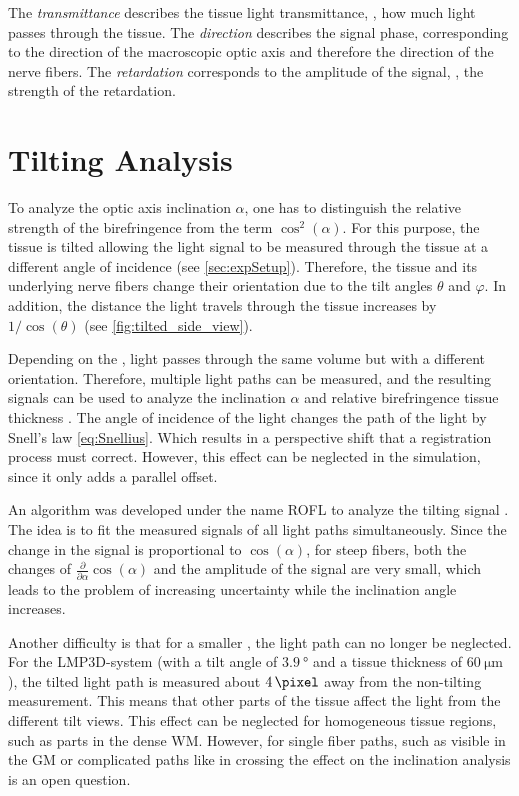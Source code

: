 %
The \textit{transmittance} describes the tissue light transmittance, \ie{}, how much light passes through the tissue.
The \textit{direction} describes the signal phase, corresponding to the direction of the macroscopic optic axis and therefore the direction of the nerve fibers.
The \textit{retardation} corresponds to the amplitude of the signal, \ie{}, the strength of the retardation.
%
%
\section{Tilting Analysis} \label{sec::InclAnalysis}
%
To analyze the optic axis inclination $\alpha$, one has to distinguish the relative strength of the birefringence from the term $\cos^2(\alpha)$.
For this purpose, the tissue is tilted allowing the light signal to be measured through the tissue at a different angle of incidence \cite{Axer2011, Wiese:887678} (see \cref{sec:expSetup}).
Therefore, the tissue and its underlying nerve fibers change their orientation due to the tilt angles $\theta$ and $\varphi$.
In addition, the distance the light travels through the tissue increases by $1/\cos(\theta)$ (see \cref{fig:tilted_side_view}).
\par
%
Depending on the \Pixelsize{}, light passes through the same volume but with a different orientation.
Therefore, multiple light paths can be measured, and the resulting signals can be used to analyze the inclination $\alpha$ and relative birefringence tissue thickness \trel{}.
The angle of incidence of the light changes the path of the light by Snell's law \cref{eq:Snellius}.
Which results in a perspective shift that a registration process must correct.
However, this effect can be neglected in the simulation, since it only adds a parallel offset.
\par
%
An algorithm was developed under the name \ac{ROFL} to analyze the tilting signal \cite{Wiese:887678,Schmitz2018}.
The idea is to fit the measured signals of all light paths simultaneously.
Since the change in the signal is proportional to $\cos(\alpha)$, for steep fibers, both the changes of $\frac{\partial}{\partial \alpha} \cos(\alpha)$ and the amplitude of the signal are very small, which leads to the problem of increasing uncertainty while the inclination angle increases.
\par
%
Another difficulty is that for a smaller \Pixelsize{}, the light path can no longer be neglected.
For the \ac{LMP3D}-system (with a tilt angle of $\SI{3.9}{\degree}$ and a tissue thickness of $\SI{60}{\micro\meter}$), the tilted light path is measured about $\SI{4}{\pixel}$ away from the non-tilting measurement.
This means that other parts of the tissue affect the light from the different tilt views.
This effect can be neglected for homogeneous tissue regions, such as parts in the dense \ac{WM}.
However, for single fiber paths, such as visible in the \ac{GM} or complicated paths like in crossing the effect on the inclination analysis is an open question.
%
%
%
